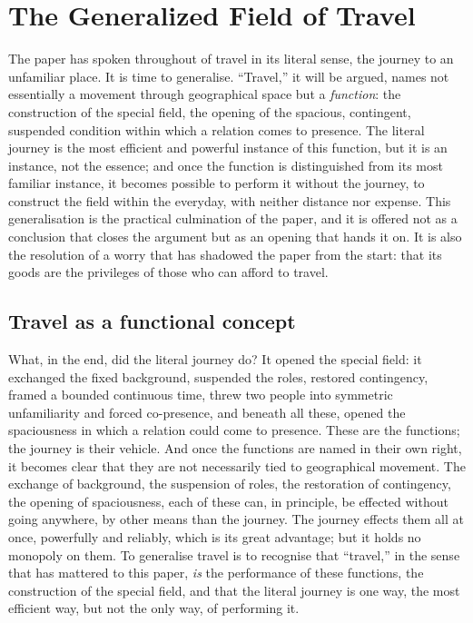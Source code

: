 \section{The Generalized Field of Travel}
\label{p21:sec:generalized}

\noindent
The paper has spoken throughout of travel in its literal sense, the journey to an unfamiliar place. It is time to generalise. ``Travel,'' it will be argued, names not essentially a movement through geographical space but a \emph{function}: the construction of the special field, the opening of the spacious, contingent, suspended condition within which a relation comes to presence. The literal journey is the most efficient and powerful instance of this function, but it is an instance, not the essence; and once the function is distinguished from its most familiar instance, it becomes possible to perform it without the journey, to construct the field within the everyday, with neither distance nor expense. This generalisation is the practical culmination of the paper, and it is offered not as a conclusion that closes the argument but as an opening that hands it on. It is also the resolution of a worry that has shadowed the paper from the start: that its goods are the privileges of those who can afford to travel.

\subsection{Travel as a functional concept}
\label{p21:sub:gen-functional}

What, in the end, did the literal journey do? It opened the special field: it exchanged the fixed background, suspended the roles, restored contingency, framed a bounded continuous time, threw two people into symmetric unfamiliarity and forced co-presence, and beneath all these, opened the spaciousness in which a relation could come to presence. These are the functions; the journey is their vehicle. And once the functions are named in their own right, it becomes clear that they are not necessarily tied to geographical movement. The exchange of background, the suspension of roles, the restoration of contingency, the opening of spaciousness, each of these can, in principle, be effected without going anywhere, by other means than the journey. The journey effects them all at once, powerfully and reliably, which is its great advantage; but it holds no monopoly on them. To generalise travel is to recognise that ``travel,'' in the sense that has mattered to this paper, \emph{is} the performance of these functions, the construction of the special field, and that the literal journey is one way, the most efficient way, but not the only way, of performing it.

